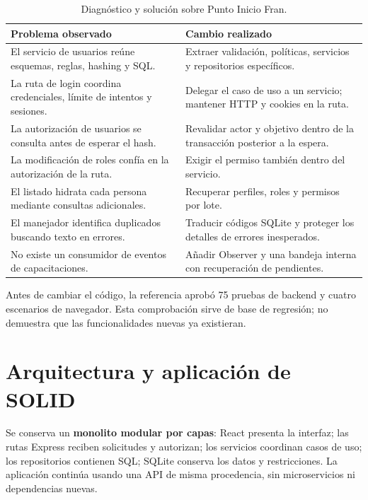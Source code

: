 \begin{table}[htbp]
\centering\small
\begin{tabular}{P{0.44\textwidth}P{0.48\textwidth}}
\toprule Problema observado & Cambio realizado \\ \midrule
El servicio de usuarios reúne esquemas, reglas, hashing y SQL. & Extraer validación, políticas, servicios y repositorios específicos. \\
La ruta de login coordina credenciales, límite de intentos y sesiones. & Delegar el caso de uso a un servicio; mantener HTTP y cookies en la ruta. \\
La autorización de usuarios se consulta antes de esperar el hash. & Revalidar actor y objetivo dentro de la transacción posterior a la espera. \\
La modificación de roles confía en la autorización de la ruta. & Exigir el permiso también dentro del servicio. \\
El listado hidrata cada persona mediante consultas adicionales. & Recuperar perfiles, roles y permisos por lote. \\
El manejador identifica duplicados buscando texto en errores. & Traducir códigos SQLite y proteger los detalles de errores inesperados. \\
No existe un consumidor de eventos de capacitaciones. & Añadir Observer y una bandeja interna con recuperación de pendientes. \\
\bottomrule
\end{tabular}
\caption{Diagnóstico y solución sobre Punto Inicio Fran.}
\end{table}

Antes de cambiar el código, la referencia aprobó 75 pruebas de backend y cuatro
escenarios de navegador. Esta comprobación sirve de base de regresión; no demuestra
que las funcionalidades nuevas ya existieran.

\section{Arquitectura y aplicación de SOLID}
Se conserva un \textbf{monolito modular por capas}: React presenta la interfaz;
las rutas Express reciben solicitudes y autorizan; los servicios coordinan casos
de uso; los repositorios contienen SQL; SQLite conserva los datos y restricciones.
La aplicación continúa usando una API de misma procedencia, sin microservicios ni
dependencias nuevas.

